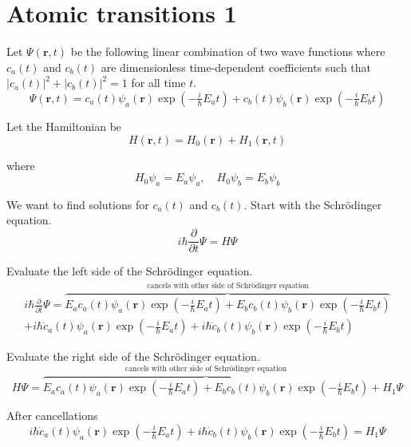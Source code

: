 

\section*{Atomic transitions 1}

Let $\Psi(\mathbf r,t)$ be the following linear combination of two wave functions
where $c_a(t)$ and $c_b(t)$ are dimensionless time-dependent coefficients
such that $|c_a(t)|^2+|c_b(t)|^2=1$ for all time $t$.
\begin{equation*}
\Psi(\mathbf r,t)
=c_a(t)\psi_a(\mathbf r)\exp\left(-\tfrac{i}{\hbar}E_at\right)
+c_b(t)\psi_b(\mathbf r)\exp\left(-\tfrac{i}{\hbar}E_bt\right)
\end{equation*}

Let the Hamiltonian be
\begin{equation*}
H(\mathbf r,t)=H_0(\mathbf r)+H_1(\mathbf r,t)
\end{equation*}

where
\begin{equation*}
H_0\psi_a=E_a\psi_a,\quad H_0\psi_b=E_b\psi_b
\end{equation*}

We want to find solutions for $c_a(t)$ and $c_b(t)$.
Start with the Schr\"odinger equation.
\begin{equation*}
i\hbar\frac{\partial}{\partial t}\Psi=H\Psi
\end{equation*}

Evaluate the left side of the Schr\"odinger equation.
\begin{multline*}
i\hbar\frac{\partial}{\partial t}\Psi
=\overbrace{E_ac_a(t)\psi_a(\mathbf r)\exp\left(-\tfrac{i}{\hbar}E_at\right)
+E_bc_b(t)\psi_b(\mathbf r)\exp\left(-\tfrac{i}{\hbar}E_bt\right)}
^\text{cancels with other side of Schr\"odinger equation}
\\
+i\hbar\dot c_a(t)\psi_a(\mathbf r)\exp\left(-\tfrac{i}{\hbar}E_at\right)
+i\hbar\dot c_b(t)\psi_b(\mathbf r)\exp\left(-\tfrac{i}{\hbar}E_bt\right)
\end{multline*}

Evaluate the right side of the Schr\"odinger equation.
\begin{equation*}
H\Psi
=\overbrace{E_ac_a(t)\psi_a(\mathbf r)\exp\left(-\tfrac{i}{\hbar}E_at\right)
+E_bc_b(t)\psi_b(\mathbf r)\exp\left(-\tfrac{i}{\hbar}E_bt\right)}
^\text{cancels with other side of Schr\"odinger equation}
+H_1\Psi
\end{equation*}

After cancellations
\begin{equation*}
i\hbar\dot c_a(t)\psi_a(\mathbf r)\exp\left(-\tfrac{i}{\hbar}E_at\right)
+i\hbar\dot c_b(t)\psi_b(\mathbf r)\exp\left(-\tfrac{i}{\hbar}E_bt\right)
=H_1\Psi
\tag{1}
\end{equation*}

